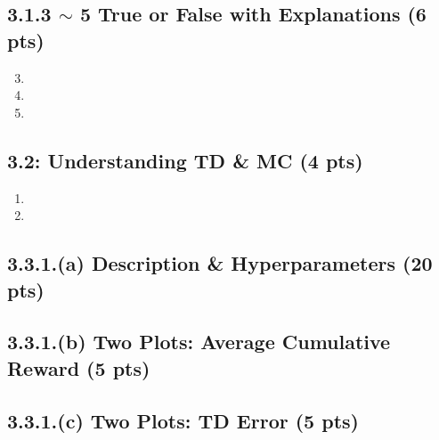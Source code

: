 \documentclass[12pt]{article}
\begin{document}
\subsection*{3.1.3 $\sim$ 5 True or False with Explanations (6 pts)}
\begin{solution}[height=10cm]
\begin{enumerate}
    \setcounter{enumi}{2}
    \item 
    \item 
    \item 
\end{enumerate}
\end{solution}

\subsection*{3.2: Understanding TD \& MC (4 pts)}
\begin{solution}[height=6cm]
\begin{enumerate}
    \item 
    \item 
\end{enumerate}
\end{solution}

\subsection*{3.3.1.(a) Description \& Hyperparameters (20 pts)}
\begin{solution}[height=12cm]
\end{solution}
\begin{solution}[height=22cm]
\end{solution}

\subsection*{3.3.1.(b) Two Plots: Average Cumulative Reward (5 pts)}
\begin{solution}[height=7cm]
\end{solution}

\subsection*{3.3.1.(c) Two Plots: TD Error (5 pts)}
\begin{solution}[height=12cm]
\end{solution}
\end{document}
